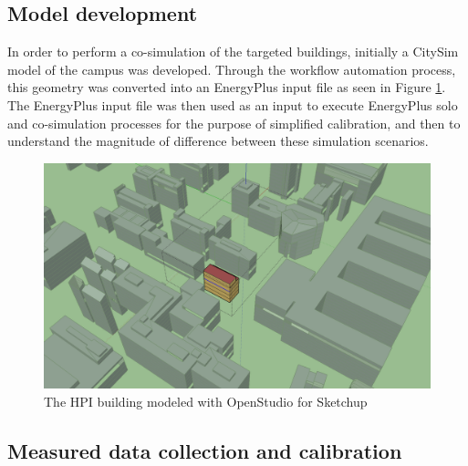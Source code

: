 \documentclass{tBPS2e}
\theoremstyle{plain}
\theoremstyle{definition}
\theoremstyle{remark}
\begin{document}
\subsection{Model development}
In order to perform a co-simulation of the targeted buildings, initially a
CitySim model of the campus was developed. Through the workflow automation
process, this geometry was converted into an EnergyPlus input file as seen in
Figure \ref{fig:HPIcampus}. The EnergyPlus input file was then used as an input
to execute EnergyPlus solo and co-simulation processes for the purpose of
simplified calibration, and then to understand the magnitude of difference
between these simulation scenarios.%

\begin{figure}[H]
\centering
\includegraphics[scale=0.2]{figures/HPI_Campus.png}
\caption{The HPI building modeled with OpenStudio for Sketchup}
\label{fig:HPIcampus}
\end{figure}


\subsection{Measured data collection and calibration}
\end{document}
